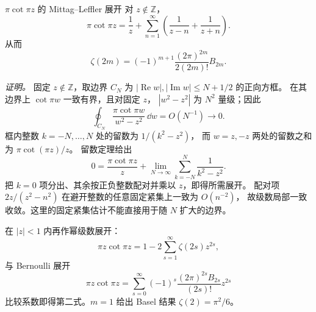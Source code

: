 \begin{advtheorem}{$\pi\cot\pi z$ 的 Mittag--Leffler 展开}\label{advA6:thm:mittag-leffler}
对 $z\notin\mathbb Z$，
\[
 \boxed{\pi\cot\pi z=
 \frac1z+\sum_{n=1}^\infty
 \left(\frac1{z-n}+\frac1{z+n}\right)}.
\]
从而
\[
 \zeta(2m)=
 (-1)^{m+1}\frac{(2\pi)^{2m}}{2(2m)!}B_{2m}.
\]
\end{advtheorem}

\noindent\textit{证明。}
固定 $z\notin\mathbb Z$，取边界 $C_N$ 为
$|\operatorname{Re}w|,|\operatorname{Im}w|\le N+1/2$ 的正向方框。
在其边界上 $\cot\pi w$ 一致有界，且对固定 $z$，
$|w^2-z^2|$ 为 $N^2$ 量级；因此
\[
 \oint_{C_N}\frac{\pi\cot\pi w}{w^2-z^2}\,\dd w=O(N^{-1})\longrightarrow0.
\]
框内整数 $k=-N,\ldots,N$ 处的留数为 $1/(k^2-z^2)$，
而 $w=z,-z$ 两处的留数之和为 $\pi\cot(\pi z)/z$。
留数定理给出
\[
 0=\frac{\pi\cot\pi z}{z}
   +\lim_{N\to\infty}\sum_{k=-N}^{N}\frac1{k^2-z^2}.
\]
把 $k=0$ 项分出、其余按正负整数配对并乘以 $z$，即得所需展开。
配对项 $2z/(z^2-n^2)$ 在避开整数的任意固定紧集上一致为 $O(n^{-2})$，
故级数局部一致收敛。这里的固定紧集估计不能直接用于随 $N$ 扩大的边界。

在 $|z|<1$ 内再作幂级数展开：
\[
 \pi z\cot\pi z=1-2\sum_{s=1}^\infty\zeta(2s)z^{2s},
\]
与 Bernoulli 展开
\[
 \pi z\cot\pi z=
 \sum_{s=0}^\infty
 (-1)^s\frac{(2\pi)^{2s}B_{2s}}{(2s)!}z^{2s}
\]
比较系数即得第二式。$m=1$ 给出 Basel 结果
$\zeta(2)=\pi^2/6$。

